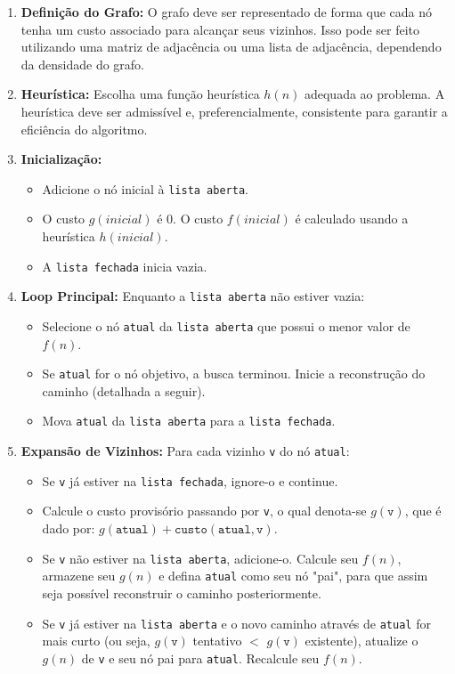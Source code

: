 \documentclass[conference]{IEEEtran}
\begin{document}
\begin{enumerate}
    \item \textbf{Definição do Grafo:} O grafo deve ser representado de forma que cada nó tenha um custo associado para alcançar seus vizinhos. Isso pode ser feito utilizando uma matriz de adjacência ou uma lista de adjacência, dependendo da densidade do grafo.
    \item \textbf{Heurística:} Escolha uma função heurística $h(n)$ adequada ao problema. A heurística deve ser admissível e, preferencialmente, consistente para garantir a eficiência do algoritmo.
    \item \textbf{Inicialização:}
    \begin{itemize}
        \item Adicione o nó inicial à \texttt{lista aberta}.
        \item O custo $g(inicial)$ é $0$. O custo $f(inicial)$ é calculado usando a heurística $h(inicial)$.
        \item A \texttt{lista fechada} inicia vazia.
    \end{itemize}

    \item \textbf{Loop Principal:} Enquanto a \texttt{lista aberta} não estiver vazia:
    \begin{itemize}
        \item Selecione o nó \texttt{atual} da \texttt{lista aberta} que possui o menor valor de $f(n)$.
        \item Se \texttt{atual} for o nó objetivo, a busca terminou. Inicie a reconstrução do caminho (detalhada a seguir).
        \item Mova \texttt{atual} da \texttt{lista aberta} para a \texttt{lista fechada}.
    \end{itemize}

    \item \textbf{Expansão de Vizinhos:} Para cada vizinho \texttt{v} do nó \texttt{atual}:
    \begin{itemize}
        \item Se \texttt{v} já estiver na \texttt{lista fechada}, ignore-o e continue.
        \item Calcule o custo provisório passando por \texttt{v}, o qual denota-se $g(\texttt{v})$, que é dado por: $g(\texttt{atual}) + \texttt{custo}(\texttt{atual}, \texttt{v})$.
        \item Se \texttt{v} não estiver na \texttt{lista aberta}, adicione-o. Calcule seu $f(n)$, armazene seu $g(n)$ e defina \texttt{atual} como seu nó "pai", para que assim seja possível reconstruir o caminho posteriormente.
        \item Se \texttt{v} já estiver na \texttt{lista aberta} e o novo caminho através de \texttt{atual} for mais curto (ou seja, $g(\texttt{v})$ tentativo $<$ $g(\texttt{v})$ existente), atualize o $g(n)$ de \texttt{v} e seu nó pai para \texttt{atual}. Recalcule seu $f(n)$.
    \end{itemize}


\end{enumerate}
\end{document}

